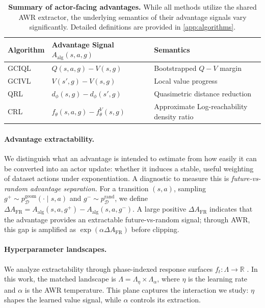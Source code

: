 \begin{table}[h]
\centering
\small
\begin{tabular}{lll}
\toprule
\textbf{Algorithm} & \textbf{Advantage Signal} \(A_{\mathrm{alg}}(s,a,g)\) & \textbf{Semantics} \\
\midrule
GCIQL & \(Q(s,a,g) - V(s,g)\) & Bootstrapped \(Q-V\) margin \\
GCIVL & \(V(s',g) - V(s,g)\) & Local value progress \\
QRL   & \(d_\phi(s,g) - d_\phi(s',g)\) & Quasimetric distance reduction \\
CRL   & \(f_\theta(s,a,g) - f_\theta^V(s,g)\) & Approximate Log-reachability density ratio \\
\bottomrule
\end{tabular}
\caption{\textbf{Summary of actor-facing advantages.} While all methods utilize the shared AWR extractor, the underlying semantics of their advantage signals vary significantly. Detailed definitions are provided in \cref{app:algorithms}.}
\label{tab:advantages}
\end{table}

\paragraph{Advantage extractability.}
We distinguish what an advantage is intended to estimate from how easily it can be converted into an actor update: whether it induces a stable, useful weighting of dataset actions under exponentiation.
A diagnostic to measure this is \emph{future-vs-random advantage separation.}
For a transition $(s,a)$, sampling $g^+\sim p_{\mathcal{D}}^{\mathrm{geom}}(\cdot\mid s,a)$ and $g^-\sim p_{\mathcal{D}}^{\mathrm{rand}}$, we define $\Delta A_{\mathrm{FR}} = A_{\mathrm{alg}}(s,a,g^+) - A_{\mathrm{alg}}(s,a,g^-)$.
A large positive \(\Delta A_{\mathrm{FR}}\) indicates that the advantage provides an extractable future-vs-random signal; through AWR, this gap is amplified as \(\exp(\alpha \Delta A_{\mathrm{FR}})\) before clipping.

\paragraph{Hyperparameter landscapes.}
We analyze extractability through phase-indexed response surfaces \(f_t:\Lambda\to\mathbb{R}\) \citep{mohan-automlconf23a}. In this work, the matched landscape is \(\Lambda = \Lambda_{\eta}\times\Lambda_{\alpha}\), where \(\eta\) is the learning rate and \(\alpha\) is the AWR temperature.
This plane captures the interaction we study: \(\eta\) shapes the learned value signal, while \(\alpha\) controls its extraction.
